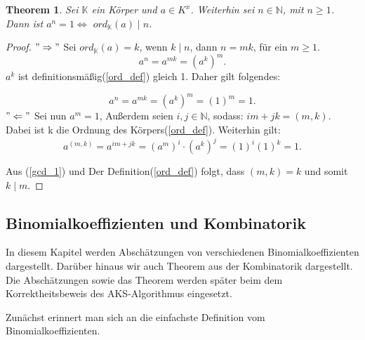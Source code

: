 \documentclass[12pt,oneside]{article}
\newtheorem{theorem}{Theorem}[section]
\theoremstyle{remark}
\theoremstyle{definition}
\begin{document}
\smallskip

\begin{theorem}
Sei $\mathbb{K}$ ein Körper und $a \in K^x$. Weiterhin sei $ n \in \mathbb{N}$, mit $n \geq 1$. Dann ist $a^n = 1 \Leftrightarrow	 $ $ord_{\mathbb{K}}(a) \mid n$. 
\end{theorem}

\smallskip

\begin{proof}
$"\Rightarrow"$\newline
Sei $ord_{\mathbb{K}}(a) = k $, wenn $k \mid n$, dann $n = mk$, für ein $ m \geq 1$.
\begin{equation}
    a^n = a^{mk} = (a^k)^m. 
\end{equation}
$a^k$ ist definitionsmäßig(\ref{ord_def}) gleich 1. Daher gilt folgendes:

\begin{equation}
    a^n = a^{mk} = (a^k)^m = (1)^m = 1.
\end{equation}
$"\Leftarrow"$\newline
Sei nun $a^m = 1$, Außerdem seien $i,j \in \mathbb{N}$, sodass:\newline
$im + jk = (m,k)$. Dabei ist k die Ordnung des Körpers(\ref{ord_def}).\newline\newline
Weiterhin gilt: 
\begin{equation}\label{gcd_1}
   a^{(m,k)} = a^{im + jk} = (a^m)^i \cdot (a^k)^j = (1)^i (1)^k = 1.
\end{equation}

Aus (\ref{gcd_1}) und Der Definition(\ref{ord_def}) folgt, dass $(m,k) = k$ und somit $k \mid m$.
\end{proof}


\subsection{Binomialkoeffizienten und Kombinatorik}
In diesem Kapitel werden Abschätzungen von verschiedenen Binomialkoeffizienten dargestellt. Darüber hinaus wir auch Theorem aus der Kombinatorik dargestellt. Die Abschätzungen sowie das Theorem werden später beim dem Korrektheitsbeweis des AKS-Algorithmus eingesetzt.\newline

Zunächst erinnert man sich an die einfachste Definition vom Binomialkoeffizienten.\newline 
\end{document}
